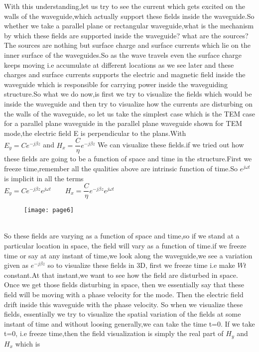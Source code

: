 	With this understanding,let us try to see the current which gets excited on the walls of the waveguide,which actually support these fields inside the waveguide.So whether we take a parallel plane or rectangular waveguide,what is the mechanism by which these fields are supported inside the waveguide? what are the sources? The sources are nothing but surface charge and surface currents which lie on the inner surface of the waveguides.So as the wave travels even the surface charge keeps moving i.e accumulate at different locations as we see later and these charges and surface currents supports the electric and magnetic field inside the waveguide which is responsible for carrying power inside the waveguiding structure.So what we do now,is first we try to visualize the fields which would be inside the waveguide and then try to visualize how the currents are disturbing on the walls of the waveguide, so let us take the simplest case which is the TEM case for a parallel plane waveguide in the parallel plane waveguide shown for TEM mode,the electric field E is perpendicular to the plans.With\\
	${E_y = Ce^{-j\beta z}}$ and ${H_x = \dfrac{C}{\eta}e^{-j\beta z}}$ We can visualize these fields.if we tried out how these fields are going to be a function of space and time in the structure.First we freeze time,remember all the qualities above are intrinsic function of time.So ${e^{j\omega t}}$ is implicit in all the terms\\
	$E_y = Ce^{-j\beta z}e^{j\omega t}\qquad H_x = {\dfrac{C}{\eta}}e^{-j\beta z} e^{j\omega t}$
		\begin{figure}[h]
		\centering
		\texttt{[image: page6]}
		\caption{}
	\end{figure}\\
 So these fields are varying as a function of space and time,so if we stand at a particular location in space, the field will vary as a function of time.if we freeze time or say at any instant of time,we look along the waveguide,we see a variation given as ${e^{-j\beta z}}$ so to visualize these fields in 3D, first we freeze time i.e make ${Wt}$ constant.At that instant,we want to see how the field are disturbed in space. Once we get those fields disturbing in space, then we essentially say that these field will be moving with a phase velocity for the mode. Then the electric field drift inside this waveguide with the phase velocity. So when we visualize these fields, essentially we try to visualize the spatial variation of the fields at some instant of time and without loosing generally,we can take the time t=0. If we take t=0, i.e freeze time,then the field visualization is simply the real part of ${H_y}$ and${H_x}$ which is \\
